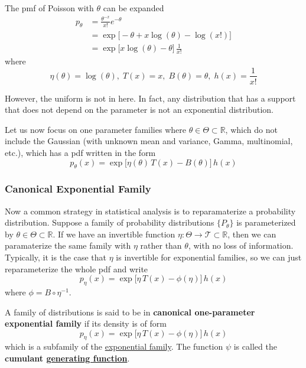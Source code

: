   \begin{example}[Poisson]
    \label{ex:poisson}
  The pmf of Poisson with $\theta$ can be expanded 
  \begin{align*}
      p_\theta & = \frac{\theta^{-x}}{x!} e^{-\theta} \\
      & = \exp \big[ -\theta + x\log(\theta) - \log(x!) \big] \\
      & = \exp \big[ x \log(\theta) - \theta \big] \, \frac{1}{x!}
  \end{align*}
  where 
  \begin{equation}
    \eta(\theta) = \log(\theta), \; T(x) = x, \; B(\theta) = \theta, \; h(x) = \frac{1}{x!}
  \end{equation}
  \end{example}

  However, the uniform is not in here. In fact, any distribution that has a support that does not depend on the parameter is not an exponential distribution. 

  Let us now focus on one parameter families where $\theta \in \Theta \subset \mathbb{R}$, which do not include the Gaussian (with unknown mean and variance, Gamma, multinomial, etc.), which has a pdf written in the form 
  \begin{equation}
    p_\theta (x) = \exp \big[ \eta (\theta) \, T(x) - B(\theta) \big] \, h(x)
  \end{equation}


  \subsubsection{Canonical Exponential Family}

    Now a common strategy in statistical analysis is to reparamaterize a probability distribution. Suppose a family of probability distributions $\{P_\theta\}$ is parameterized by $\theta \in \Theta \subset \mathbb{R}$. If we have an invertible function $\eta: \Theta \rightarrow \mathcal{T} \subset \mathbb{R}$, then we can paramaterize the same family with $\eta$ rather than $\theta$, with no loss of information. Typically, it is the case that $\eta$ is invertible for exponential families, so we can just reparameterize the whole pdf and write 
    \begin{equation}
      p_\eta (x) = \exp \big[ \eta \, T(x) - \phi(\eta) \big] \, h(x)
    \end{equation}
    where $\phi = B \circ \eta^{-1}$. 

    \begin{definition}
      \label{def:canonical-one-parameter-exponential-family}
    A family of distributions is said to be in \textbf{canonical one-parameter exponential family} if its density is of form 
    \begin{equation}
      p_\eta (x) = \exp \big[ \eta \, T(x) - \phi(\eta) \big] \, h(x)
    \end{equation}
    which is a subfamily of the \hyperref[def:exponential-family]{exponential family}. The function $\psi$ is called the \textbf{cumulant \hyperref[sp-def:generating-function]{generating function}}. 
    \end{definition}

